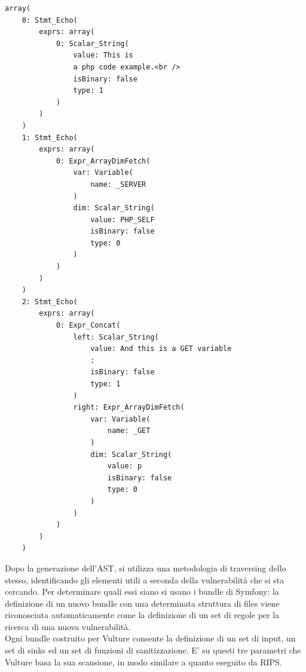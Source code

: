 \begin{lstlisting}
array(
    0: Stmt_Echo(
        exprs: array(
            0: Scalar_String(
                value: This is 
                a php code example.<br />
                isBinary: false
                type: 1
            )
        )
    )
    1: Stmt_Echo(
        exprs: array(
            0: Expr_ArrayDimFetch(
                var: Variable(
                    name: _SERVER
                )
                dim: Scalar_String(
                    value: PHP_SELF
                    isBinary: false
                    type: 0
                )
            )
        )
    )
    2: Stmt_Echo(
        exprs: array(
            0: Expr_Concat(
                left: Scalar_String(
                    value: And this is a GET variable
                    : 
                    isBinary: false
                    type: 1
                )
                right: Expr_ArrayDimFetch(
                    var: Variable(
                        name: _GET
                    )
                    dim: Scalar_String(
                        value: p
                        isBinary: false
                        type: 0
                    )
                )
            )
        )
    )
\end{lstlisting}

Dopo la generazione dell'AST, si utilizza una metodologia di traversing dello stesso, identificando gli elementi utili a seconda della vulnerabilità che si sta cercando. Per determinare quali essi siano si usano i bundle di Symfony: la definizione di un nuovo bundle con una determinata struttura di files viene riconosciuta automaticamente come la definizione di un set di regole per la ricerca di una nuova vulnerabilità.\\
Ogni bundle costruito per Vulture consente la definizione di un set di input, un set di sinks ed un set di funzioni di sanitizzazione. E' su questi tre parametri che Vulture basa la sua scansione, in modo similare a quanto eseguito da RIPS.
 
